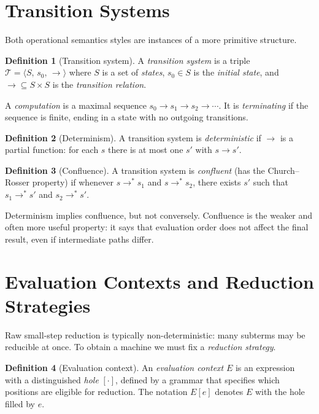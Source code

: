 \documentclass[11pt, a4paper]{article}
\theoremstyle{definition}
\newtheorem{definition}{Definition}[section]
\theoremstyle{plain}
\theoremstyle{remark}
\begin{document}
\section{Transition Systems}

Both operational semantics styles are instances of a more primitive structure.

\begin{definition}[Transition system]
  A \emph{transition system} is a triple $\mathcal{T} = \langle S,\, s_0,\, \to\rangle$
  where $S$ is a set of \emph{states}, $s_0 \in S$ is the \emph{initial
  state}, and ${\to} \subseteq S \times S$ is the \emph{transition relation}.
\end{definition}

A \emph{computation} is a maximal sequence
$s_0 \to s_1 \to s_2 \to \cdots$. It is \emph{terminating} if the sequence
is finite, ending in a state with no outgoing transitions.

\begin{definition}[Determinism]
  A transition system is \emph{deterministic} if $\to$ is a partial function:
  for each $s$ there is at most one $s'$ with $s \to s'$.
\end{definition}

\begin{definition}[Confluence]
  A transition system is \emph{confluent} (has the Church--Rosser property)
  if whenever $s \to^{*} s_1$ and $s \to^{*} s_2$, there exists $s'$ such
  that $s_1 \to^{*} s'$ and $s_2 \to^{*} s'$.
\end{definition}

Determinism implies confluence, but not conversely. Confluence is the weaker
and often more useful property: it says that evaluation order does not affect
the final result, even if intermediate paths differ.


\section{Evaluation Contexts and Reduction Strategies}

Raw small-step reduction is typically non-deterministic: many subterms may
be reducible at once. To obtain a machine we must fix a
\emph{reduction strategy}.

\begin{definition}[Evaluation context]
  An \emph{evaluation context} $E$ is an expression with a distinguished
  \emph{hole} $[\cdot]$, defined by a grammar that specifies which positions
  are eligible for reduction. The notation $E[e]$ denotes $E$ with the hole
  filled by $e$.
\end{definition}
\end{document}
